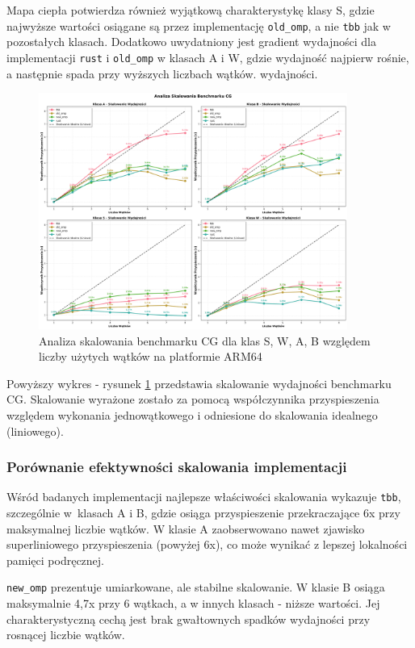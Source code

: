 Mapa ciepła potwierdza również wyjątkową charakterystykę klasy S, gdzie najwyższe wartości osiągane są przez implementację \texttt{old\_omp}, a nie \texttt{tbb} jak w pozostałych klasach. Dodatkowo uwydatniony jest gradient wydajności dla implementacji \texttt{rust} i \texttt{old\_omp} w klasach A i W, gdzie wydajność najpierw rośnie, a następnie spada przy wyższych liczbach wątków. wydajności.

\begin{figure}[H]
    \centering
    \includegraphics[width=0.9\textwidth]{analiza/images/parallel/cg/x86/cg_analiza_skalowania.png}
    \caption{Analiza skalowania benchmarku CG dla klas S, W, A, B względem liczby użytych wątków na platformie ARM64}
    \label{cg_analiza_skalowania_x86_64}
\end{figure}
Powyższy wykres - rysunek \ref{cg_analiza_skalowania_x86_64} przedstawia skalowanie wydajności benchmarku CG. Skalowanie wyrażone zostało za pomocą współczynnika przyspieszenia względem wykonania jednowątkowego i odniesione do skalowania idealnego (liniowego).
\subsubsection{Porównanie efektywności skalowania implementacji}
Wśród badanych implementacji najlepsze właściwości skalowania wykazuje \texttt{tbb}, szczególnie w~klasach A i B, gdzie osiąga przyspieszenie przekraczające 6x przy maksymalnej liczbie wątków. W klasie A zaobserwowano nawet zjawisko superliniowego przyspieszenia (powyżej 6x), co może wynikać z lepszej lokalności pamięci podręcznej.

\texttt{new\_omp} prezentuje umiarkowane, ale stabilne skalowanie. W klasie B osiąga maksymalnie 4,7x przy 6 wątkach, a w innych klasach - niższe wartości. Jej charakterystyczną cechą jest brak gwałtownych spadków wydajności przy rosnącej liczbie wątków.

